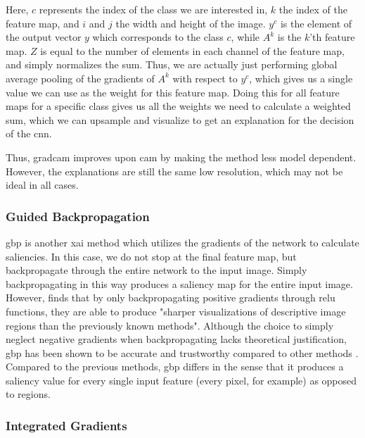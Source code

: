 \documentclass[UKenglish]{uiomasterthesis} %
\theoremstyle{definition}
\begin{document}
Here, $c$ represents the index of the class we are interested in, $k$ the index of the feature map, and $i$ and $j$ the width and height of the image. $y^c$ is the element of the output vector $y$ which corresponds to the class $c$, while $A^k$ is the $k$'th feature map. $Z$ is equal to the number of elements in each channel of the feature map, and simply normalizes the sum. Thus, we are actually just performing global average pooling of the gradients of $A^k$ with respect to $y^c$, which gives us a single value we can use as the weight for this feature map. Doing this for all feature maps for a specific class gives us all the weights we need to calculate a weighted sum, which we can upsample and visualize to get an explanation for the decision of the \ac{cnn}.

Thus, \ac{gradcam} improves upon \ac{cam} by making the method less model dependent. However, the explanations are still the same low resolution, which may not be ideal in all cases.
\\

\subsubsection{Guided Backpropagation} \label{section:guidebackpropagation}

\ac{gbp} \cite{gbp} is another \ac{xai} method which utilizes the gradients of the network to calculate saliencies. In this case, we do not stop at the final feature map, but backpropagate through the entire network to the input image. Simply backpropagating in this way produces a saliency map for the entire input image. However, \cite{gbp} finds that by only backpropagating positive gradients through \acs{relu} functions, they are able to produce "sharper visualizations of descriptive image regions than the previously known methods". Although the choice to simply neglect negative gradients when backpropagating lacks theoretical justification, \ac{gbp} has been shown to be accurate and trustworthy compared to other methods \cite{arras2022clevr, pianpanit2021parkinson}. Compared to the previous methods, \ac{gbp} differs in the sense that it produces a saliency value for every single input feature (every pixel, for example) as opposed to regions.

\subsubsection{Integrated Gradients} \label{section:integratedgradients}
\end{document}
